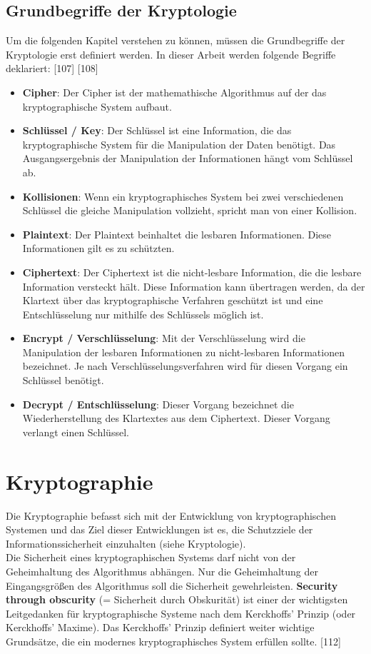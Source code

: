 \documentclass[12pt,a4paper]{report}
\begin{document}
\begin{onehalfspace}
\subsection{Grundbegriffe der Kryptologie}

Um die folgenden Kapitel verstehen zu können, müssen die Grundbegriffe der Kryptologie erst definiert werden. In dieser Arbeit werden folgende Begriffe deklariert: [107] [108]

\begin{itemize}
\item \textbf{Cipher}: Der Cipher ist der mathemathische Algorithmus auf der das kryptographische System aufbaut.
\item \textbf{Schlüssel / Key}: Der Schlüssel ist eine Information, die das kryptographische System für die Manipulation der Daten benötigt. Das Ausgangsergebnis der Manipulation der Informationen hängt vom Schlüssel ab.
\item \textbf{Kollisionen}: Wenn ein kryptographisches System bei zwei verschiedenen Schlüssel die gleiche Manipulation vollzieht, spricht man von einer Kollision.
\item \textbf{Plaintext}: Der Plaintext beinhaltet die lesbaren Informationen. Diese Informationen gilt es zu schützten.
\item \textbf{Ciphertext}: Der Ciphertext ist die nicht-lesbare Information, die die lesbare Information versteckt hält. Diese Information kann übertragen werden, da der Klartext über das kryptographische Verfahren geschützt ist und eine Entschlüsselung nur mithilfe des Schlüssels möglich ist.
\item \textbf{Encrypt / Verschlüsselung}: Mit der Verschlüsselung wird die Manipulation der lesbaren Informationen zu nicht-lesbaren Informationen bezeichnet. Je nach Verschlüsselungsverfahren wird für diesen Vorgang ein Schlüssel benötigt.
\item \textbf{Decrypt / Entschlüsselung}: Dieser Vorgang bezeichnet die Wiederherstellung des Klartextes aus dem Ciphertext. Dieser Vorgang verlangt einen Schlüssel.
\end{itemize}

\section{Kryptographie}

Die Kryptographie befasst sich mit der Entwicklung von kryptographischen Systemen und das Ziel dieser Entwicklungen ist es, die Schutzziele der Informationssicherheit einzuhalten (siehe Kryptologie). \\
Die Sicherheit eines kryptographischen Systems darf nicht von der Geheimhaltung des Algorithmus abhängen. Nur die Geheimhaltung der Eingangsgrößen des Algorithmus soll die Sicherheit gewehrleisten. \textbf{Security through obscurity} (= Sicherheit durch Obskurität) ist einer der wichtigsten Leitgedanken für kryptographische Systeme nach dem Kerckhoffs' Prinzip (oder Kerckhoffs' Maxime). Das Kerckhoffs' Prinzip definiert weiter wichtige Grundsätze, die ein modernes kryptographisches System erfüllen sollte. [112]


\end{onehalfspace}
\end{document}
